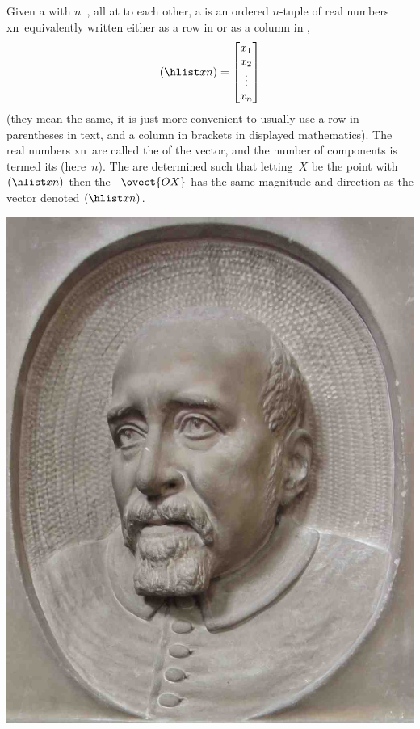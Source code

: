 \begin{definition} \label{def:vecs} 
Given a  with \(n\)~, all at  to each other, a  is an ordered \(n\)-tuple of real numbers \hlist xn\ equivalently written either as a row in  or as a column in ,
\begin{equation*}
(\hlist xn)=\begin{bmatrix} x_1\\x_2\\\vdots\\x_n \end{bmatrix}
\end{equation*}
(they mean the same, it is just more convenient to usually use a row in parentheses in text, and a column in brackets in displayed mathematics).
The real numbers \hlist xn\ are called the  of the vector, and the number of components is termed its  (here~\(n\)).
The  are determined such that letting~\(X\) be the point with  \((\hlist xn)\) then the ~\(\ovect{OX}\) has the same magnitude and direction as the vector denoted \((\hlist xn)\).
\begin{aside}
\includegraphics[width=\linewidth]{Vectors/RobertRecorde}

\end{aside}
\end{definition}
